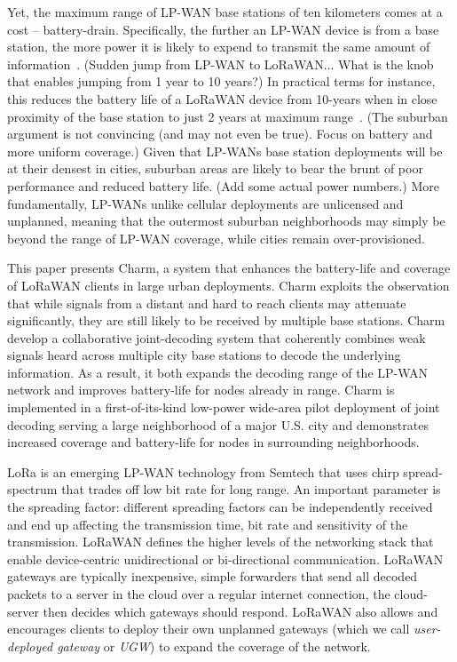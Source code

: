 Yet, the maximum range of LP-WAN base stations of ten kilometers comes at a
cost -- battery-drain. Specifically, the further an LP-WAN device is from a
base station, the more power it is likely to expend to transmit the same
amount of information{\color{red}~\cite{}}. {\color{blue} (Sudden jump from
LP-WAN to LoRaWAN... What is the knob that enables jumping from 1 year to 10
years?)} In practical terms for instance, this reduces the battery life of a
LoRaWAN device from 10-years when in close proximity of the base station to
just 2 years at maximum range{\color{red}~\cite{}}. {\color{blue} (The suburban
argument is not convincing (and may not even be true). Focus on battery and
more uniform coverage.)} Given that LP-WANs base station deployments will be
at their densest in cities, suburban areas are likely to bear the brunt of
poor performance and reduced battery life. {\color{blue} (Add some actual
power numbers.)} More fundamentally, LP-WANs unlike cellular deployments are
unlicensed and unplanned, meaning that the outermost suburban neighborhoods
may simply be beyond the range of LP-WAN coverage, while cities remain
over-provisioned.


This paper presents Charm, a system that enhances the battery-life and
coverage of LoRaWAN clients in large urban deployments. Charm exploits the
observation that while signals from a distant and hard to reach clients may
attenuate significantly, they are still likely to be received by multiple base
stations. Charm develop a collaborative joint-decoding system that coherently
combines weak signals heard across multiple city base stations to decode the
underlying information. As a result, it both expands the decoding range of the
LP-WAN network and improves battery-life for nodes already in range. Charm is
implemented in a first-of-its-kind low-power wide-area pilot deployment of
joint decoding serving a large neighborhood of a major U.S. city and
demonstrates increased coverage and battery-life for nodes in surrounding
neighborhoods.

LoRa is an emerging LP-WAN technology from Semtech that uses chirp
spread-spectrum that trades off low bit rate for long range. An important
parameter is the spreading factor: different spreading factors can be
independently received and end up affecting the transmission time, bit rate
and sensitivity of the transmission. LoRaWAN defines the higher levels of the
networking stack that enable device-centric unidirectional or bi-directional
communication. LoRaWAN gateways are typically inexpensive, simple forwarders
that send all decoded packets to a server in the cloud over a regular internet
connection, the cloud-server then decides which gateways should respond.
LoRaWAN also allows and encourages clients to deploy their own unplanned
gateways (which we call \textit{user-deployed gateway} or \textit{UGW}) to
expand the coverage of the network.

